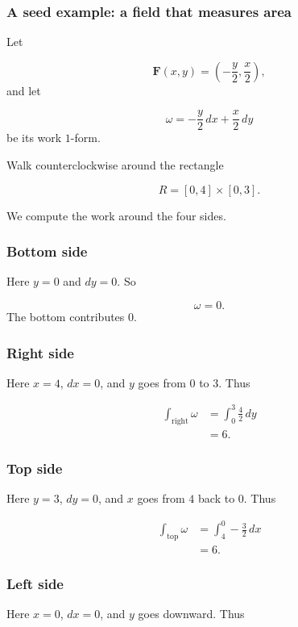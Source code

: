\subsubsection*{A seed example: a field that measures area}

Let

\[
    \mathbf F(x,y)=\left(-\frac y2,\frac x2\right),
\]
and let

\[
    \omega=-\frac y2\,dx+\frac x2\,dy
\]
be its work \(1\)-form.

Walk counterclockwise around the rectangle

\[
    R=[0,4]\times[0,3].
\]

We compute the work around the four sides.

\subsubsection*{Bottom side}

Here \(y=0\) and \(dy=0\).  So

\[
    \omega=0.
\]
The bottom contributes \(0\).

\subsubsection*{Right side}

Here \(x=4\), \(dx=0\), and \(y\) goes from \(0\) to \(3\).  Thus

\[
\begin{aligned}
\int_{\text{right}}\omega
&=
\int_0^3 \frac{4}{2}\,dy\\
&=
6.
\end{aligned}
\]

\subsubsection*{Top side}

Here \(y=3\), \(dy=0\), and \(x\) goes from \(4\) back to \(0\).  Thus

\[
\begin{aligned}
\int_{\text{top}}\omega
&=
\int_4^0 -\frac32\,dx\\
&=
6.
\end{aligned}
\]

\subsubsection*{Left side}

Here \(x=0\), \(dx=0\), and \(y\) goes downward.  Thus

